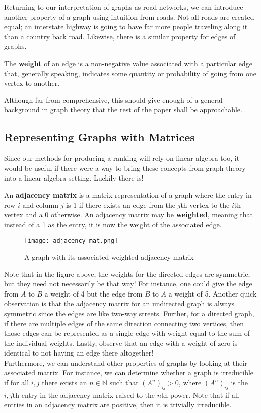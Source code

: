 \documentclass[10pt]{article}
\newenvironment{defn}[2][Definition:]{\begin{trivlist}
\item[\hskip \labelsep {\bfseries #1}\hskip \labelsep {\bfseries #2}]}{\end{trivlist}}
\newcommand{\N}{\mathbb{N}}
\begin{document}
Returning to our interpretation of graphs as road networks, we can introduce another property of a graph using intuition from roads. Not all roads are created equal; an interstate highway is going to have far more people traveling along it than a country back road. Likewise, there is a similar property for edges of graphs.
\begin{defn}{}
The \textbf{weight} of an edge is a non-negative value associated with a particular edge that, generally speaking, indicates some quantity or probability of going from one vertex to another.
\end{defn}
Although far from comprehensive, this should give enough of a general background in graph theory that the rest of the paper shall be approachable.
\subsection{Representing Graphs with Matrices}
Since our methods for producing a ranking will rely on linear algebra too, it would be useful if there were a way to bring these concepts from graph theory into a linear algebra setting. Luckily there is!
\begin{defn}{}
An \textbf{adjacency matrix} is a matrix representation of a graph where the entry in row $i$ and column $j$ is 1 if there exists an edge from the $j$th vertex to the $i$th vertex and a 0 otherwise. An adjacency matrix may be \textbf{weighted}, meaning that instead of a 1 as the entry, it is now the weight of the associated edge.
\end{defn}
\begin{figure}[h!]
    \centering
    \texttt{[image: adjacency\_mat.png]}
    \caption{A graph with its associated weighted adjacency matrix}
    \label{fig:my_label}
\end{figure}
Note that in the figure above, the weights for the directed edges are symmetric, but they need not necessarily be that way! For instance, one could give the edge from $A$ to $B$ a weight of 4 but the edge from $B$ to $A$ a weight of 5. Another quick observation is that the adjacency matrix for an undirected graph is always symmetric since the edges are like two-way streets. Further, for a directed graph, if there are multiple edges of the same direction connecting two vertices, then those edges can be represented as a single edge with weight equal to the sum of the individual weights. Lastly, observe that an edge with a weight of zero is identical to not having an edge there altogether!\vspace{0.5cm}\\
Furthermore, we can understand other properties of graphs by looking at their associated matrix. For instance, we can determine whether a graph is irreducible if for all $i,j$ there exists an $n\in \N$ such that $(A^n)_{ij}>0$, where $(A^n)_{ij}$ is the $i,j$th entry in the adjacency matrix raised to the $n$th power. Note that if all entries in an adjacency matrix are positive, then it is trivially irreducible.
\end{document}
